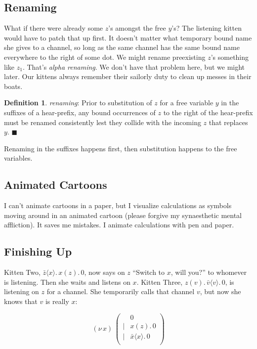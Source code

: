 \documentclass[10pt,oneside,x11names]{article}
\newcommand\napping    [0]{0}
\newcommand\chatting   [3]{\bar{#1}\langle{#2}\rangle{}.\,#3}
\newcommand\listening  [3]{#1(#2).\,#3}
\newcommand\whispering [2]{(\nu\,#1)\,{#2}}
\newcommand{\kitThree}{\listening{z}{v}{\chatting{v}{v}{\napping}}}
\theoremstyle{definition}
\newtheorem{definition}{Definition}
\theoremstyle{warning}
\begin{document}
\subsection{Renaming}
\label{sec:orgc0b66bd}

What if there were already some \(z\)'s amongst the free \(y\)'s? The
listening kitten would have to patch that up first. It doesn't
matter what temporary bound name she gives to a channel, so long
as the same channel has the same bound name everywhere to the
right of some dot. We might rename preexisting \(z\)'s something
like \(z_1\). That's \emph{alpha renaming}. We don't have that problem
here, but we might later. Our kittens always remember their
sailorly duty to clean up messes in their boats.

\label{def:renaming}
\begin{definition}{\emph{renaming}:}
  Prior to substitution of $z$ for a free variable $y$ in the suffixes of
  a hear-prefix,
  any bound occurrences of $z$ to the right of the hear-prefix must be
  renamed consistently lest they collide with the incoming $z$
  that replaces $y$. $\blacksquare$
\end{definition}

Renaming in the suffixes happens first, then substitution happens
to the free variables.

\subsection{Animated Cartoons}
\label{sec:org72313b0}

I can't animate cartoons in a paper, but I visualize calculations
as symbols moving around in an animated cartoon (please forgive my
synaesthetic mental affliction). It saves me mistakes. I animate
calculations with pen and paper.

\subsection{Finishing Up}
\label{sec:org6c09a0a}

Kitten Two, \(\chatting{z}{x}{\listening{x}{z}{\napping}}\), now
says on \(z\) ``Switch to \(x\), will you?'' to whomever is listening.
Then she waits and listens on \(x\). Kitten Three, \(\kitThree\), is
listening on \(z\) for a channel.  She temporarily calls that channel
\(v\), but now she knows that \(v\) is really \(x\):

\begin{equation}
\whispering{x}{\left(
\begin{array}{clll}
 {}     & \napping  \\
 \vert  & {\listening{x}{z}{\napping}} \\
 \vert  & {\chatting{x}{x}{\napping}} \\
\end{array}\right)}
\end{equation}
\end{document}
